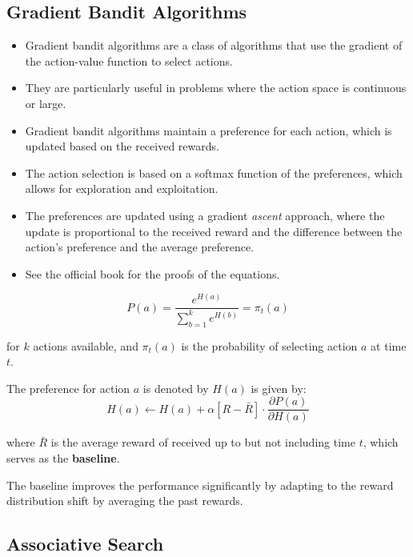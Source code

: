\subsection{Gradient Bandit Algorithms}
\begin{itemize}
\item Gradient bandit algorithms are a class of algorithms that use the gradient of the action-value function to select actions.
\item They are particularly useful in problems where the action space is continuous or large.
\item Gradient bandit algorithms maintain a preference for each action, which is updated based on the received rewards.
\item The action selection is based on a softmax function of the preferences, which allows for exploration and exploitation.
\item The preferences are updated using a gradient \textit{ascent} approach, where the update is proportional to the received reward and the difference between the action's preference and the average preference.
\item See the official book for the proofs of the equations.
\end{itemize}

\begin{equation}
    P(a) = \frac{e^{H(a)}}{\sum_{b=1}^{k} e^{H(b)}} = \pi_t(a)
\end{equation}

for \(k\) actions available, and $\pi_t(a)$ is the probability of selecting action \(a\) at time \(t\).

The preference for action \(a\) is denoted by \(H(a)\) is given by:
\begin{equation}
    H(a) \leftarrow H(a) + \alpha [R - \bar{R}] \cdot \frac{\partial P(a)}{\partial H(a)}
\end{equation}

where \(\bar{R}\) is the average reward of received up to but not including time \(t\), which serves as the \textbf{baseline}.

The baseline improves the performance significantly by adapting to the reward distribution shift by averaging the past rewards. 




\subsection{Associative Search}

